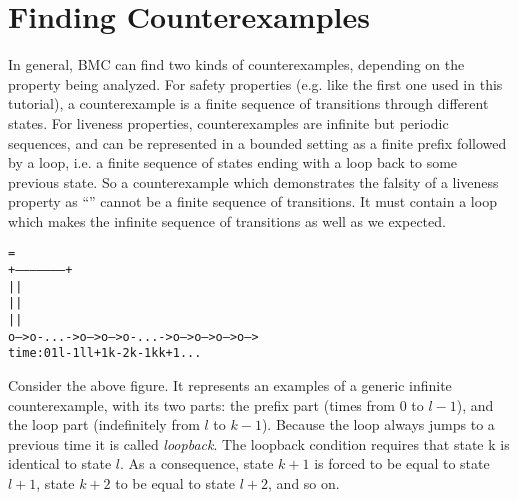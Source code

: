 \section{Finding Counterexamples}
\label{Finding Counterexamples}
In general, BMC can find two kinds of counterexamples, depending on the
property being analyzed. For safety properties (e.g. like the first one
used in this tutorial), a counterexample is a finite sequence of
transitions through different states.  For liveness properties,
counterexamples are infinite but periodic sequences, and can be
represented in a bounded setting as a finite prefix followed by a loop,
i.e. a finite sequence of states ending with a loop back to some
previous state. So a counterexample which demonstrates the falsity of a
liveness property as ``'' cannot be a finite sequence of
transitions. It must contain a loop which makes the infinite sequence of
transitions as well as we expected.
\begin{alltt}
                                   =
                        +---------------------+
                        |                     |
                        |                     |
                        |                     |
       o--->o-...->o--->o--->o-...->o--->o--->o--->o--->
time:  0    1      l-1  l    l+1    k-2  k-1  k    k+1   ...
\end{alltt}

Consider the above figure. It represents an examples of a generic
infinite counterexample, with its two parts: the prefix part (times from
$0$ to $l-1$), and the loop part (indefinitely from $l$ to $k-1$). Because the
loop always jumps to a previous time it is called \emph{loopback}. 
The loopback condition requires that state k is identical to state $l$. 
As a consequence, state $k+1$ is forced to be equal to
state $l+1$, state $k+2$ to be equal to state $l+2$, and so on.

